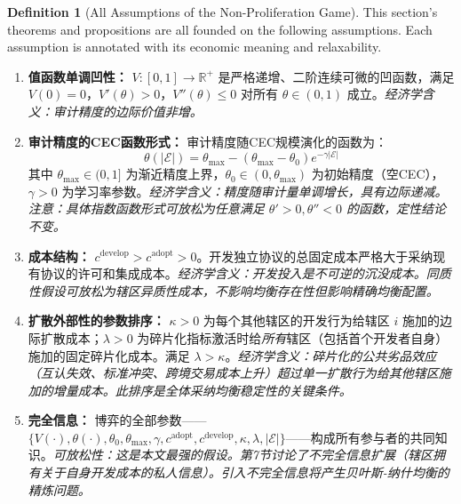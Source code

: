\documentclass[12pt,a4paper]{ctexart}
\theoremstyle{definition}
\newtheorem{definition}{Definition}[section]
\theoremstyle{remark}
\begin{document}
\begin{definition}[All Assumptions of the Non-Proliferation Game]
\label{def:assumptions-npe}
This section's theorems and propositions are all founded on the following assumptions. Each assumption is annotated with its economic meaning and relaxability.

\begin{enumerate}[label=\textbf{A\arabic*}, leftmargin=*, itemsep=4pt]
\item \textbf{值函数单调凹性：} $V: [0,1] \to \mathbb{R}^+$ 是严格递增、二阶连续可微的凹函数，满足 $V(0) = 0$，$V'(\theta) > 0$，$V''(\theta) \leq 0$ 对所有 $\theta \in (0,1)$ 成立。\hfill\textit{经济学含义：审计精度的边际价值非增。}

\item \textbf{审计精度的CEC函数形式：} 审计精度随CEC规模演化的函数为：
\begin{equation}
\theta(|\mathcal{E}|) = \theta_{\max} - (\theta_{\max} - \theta_0) e^{-\gamma |\mathcal{E}|}
\end{equation}
其中 $\theta_{\max} \in (0,1]$ 为渐近精度上界，$\theta_0 \in (0, \theta_{\max})$ 为初始精度（空CEC），$\gamma > 0$ 为学习率参数。\hfill\textit{经济学含义：精度随审计量单调增长，具有边际递减。注意：具体指数函数形式可放松为任意满足 $\theta' > 0, \theta'' < 0$ 的函数，定性结论不变。}

\item \textbf{成本结构：} $c^{\text{develop}} > c^{\text{adopt}} > 0$。开发独立协议的总固定成本严格大于采纳现有协议的许可和集成成本。\hfill\textit{经济学含义：开发投入是不可逆的沉没成本。同质性假设可放松为辖区异质性成本，不影响均衡存在性但影响精确均衡配置。}

\item \textbf{扩散外部性的参数排序：} $\kappa > 0$ 为每个其他辖区的开发行为给辖区 $i$ 施加的边际扩散成本；$\lambda > 0$ 为碎片化指标激活时给\textit{所有}辖区（包括首个开发者自身）施加的固定碎片化成本。满足 $\lambda > \kappa$。\hfill\textit{经济学含义：碎片化的公共劣品效应（互认失效、标准冲突、跨境交易成本上升）超过单一扩散行为给其他辖区施加的增量成本。此排序是全体采纳均衡稳定性的关键条件。}

\item \textbf{完全信息：} 博弈的全部参数——$\{V(\cdot), \theta(\cdot), \theta_0, \theta_{\max}, \gamma, c^{\text{adopt}}, c^{\text{develop}}, \kappa, \lambda, |\mathcal{E}|\}$——构成所有参与者的共同知识。\hfill\textit{可放松性：这是本文最强的假设。第7节讨论了不完全信息扩展（辖区拥有关于自身开发成本的私人信息）。引入不完全信息将产生贝叶斯-纳什均衡的精炼问题。}


\end{enumerate}
\end{definition}
\end{document}
